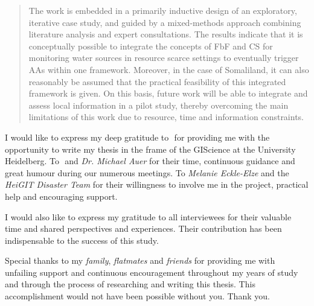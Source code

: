\documentclass[
11pt, %
oneside, %
english, %
onehalfspacing, %
nolistspacing, %
parskip, %
headsepline, %
]{MastersDoctoralThesis} %
\begin{document}
\begin{abstract}
The work is embedded in a primarily inductive design of an exploratory, iterative case study, and guided by a mixed-methods approach combining literature analysis and expert consultations. The results indicate that it is conceptually possible to integrate the concepts of FbF and CS for monitoring water sources in resource scarce settings to eventually trigger AAs within one framework. Moreover, in the case of Somaliland, it can also reasonably be assumed that the practical feasibility of this integrated framework is given. On this basis, future work will be able to integrate and assess local information in a pilot study, thereby overcoming the main limitations of this work due to resource, time and information constraints.


\end{abstract}


\begin{acknowledgements}
\addchaptertocentry{\acknowledgementname} %
\vspace{1cm}

I would like to express my deep gratitude to \examname\,\,for providing me with the opportunity to write my thesis in the frame of the GIScience at the University Heidelberg.\newline
To \supname\,\,and \textit{Dr. Michael Auer} for their time, continuous guidance and great humour during our numerous meetings.\newline
To \textit{Melanie Eckle-Elze} and the \textit{HeiGIT Disaster Team} for their willingness to involve me in the project, practical help and encouraging support.

I would also like to express my gratitude to all interviewees for their valuable time and shared perspectives and experiences. Their contribution has been indispensable to the success of this study.

Special thanks to my \textit{family}, \textit{flatmates} and \textit{friends} for providing me with unfailing support and continuous encouragement throughout my years of study and through the process of researching and writing this thesis. This accomplishment would not have been possible without you. Thank you.

\end{acknowledgements}
\end{document}
